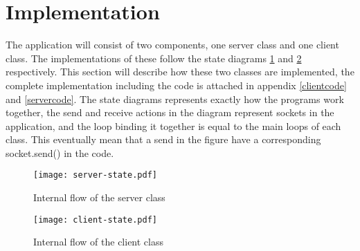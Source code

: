 \newpage

\section{Implementation}
The application will consist of two components, one server class and one client class. The implementations of these follow the state diagrams \ref{fig:server-state} and \ref{fig:client-state} respectively. This section will describe how these two classes are implemented, the complete implementation including the code is attached in appendix \ref{clientcode} and \ref{servercode}. The state diagrams represents exactly how the programs work together, the send and receive actions in the diagram represent sockets in the application, and the loop binding it together is equal to the main loops of each class. This eventually mean that a send in the figure have a corresponding socket.send() in the code.

\begin{figure}
\centering
\texttt{[image: server-state.pdf]}
\caption{Internal flow of the server class}
\label{fig:server-state}
\end{figure}


\begin{figure}
\centering
\texttt{[image: client-state.pdf]}
\caption{Internal flow of the client class}
\label{fig:client-state}
\end{figure}

